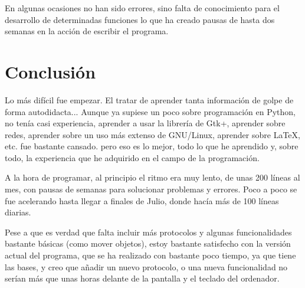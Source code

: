 \documentclass[a4paper, 11pt]{report} %
\begin{document}
En algunas ocasiones no han sido errores, sino falta de conocimiento para el desarrollo de determinadas funciones lo que ha creado pausas de hasta dos semanas en la acción de escribir el programa.

\section{Conclusión}
Lo más difícil fue empezar. El tratar de aprender tanta información de golpe de forma autodidacta... Aunque ya supiese un poco sobre programación en Python, no tenía casi experiencia, aprender a usar la librería de Gtk+, aprender sobre redes, aprender sobre un uso más extenso de GNU/Linux, aprender sobre \LaTeX , etc. fue bastante cansado. pero eso es lo mejor, todo lo que he aprendido y, sobre todo, la experiencia que he adquirido en el campo de la programación.

A la hora de programar, al principio el ritmo era muy lento, de unas 200 líneas al mes, con pausas de semanas para solucionar problemas y errores. Poco a poco se fue acelerando hasta llegar a finales de Julio, donde hacía más de 100 líneas diarias.

Pese a que es verdad que falta incluir más protocolos y algunas funcionalidades bastante básicas (como mover objetos), estoy bastante satisfecho con la versión actual del programa, que se ha realizado con bastante poco tiempo, ya que tiene las bases, y creo que añadir un nuevo protocolo, o una nueva funcionalidad no serían más que unas horas delante de la pantalla y el teclado del ordenador.

\glsaddall
\renewcommand{\glsnamefont}[1]{\makefirstuc{#1}}

\nocite{*}
%
\printbibliography[heading=bibintoc]

\appendix
\printglossary[type=\acronymtype, style=mcolindex, title=Glosario y acrónimos, toctitle=Glosario y acrónimos]
\end{document}

